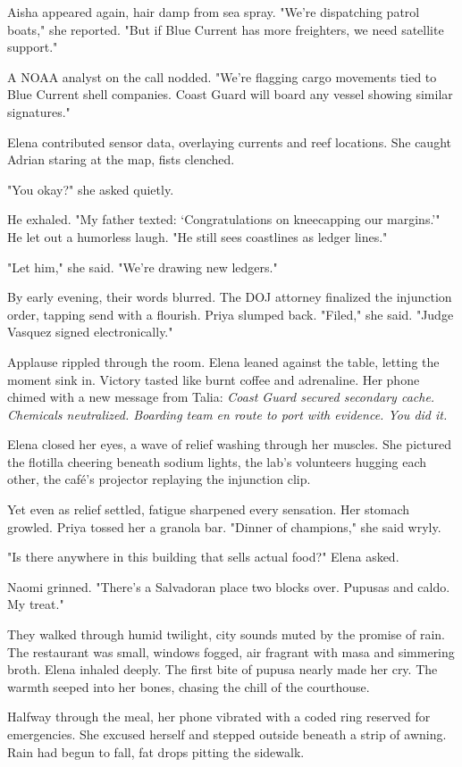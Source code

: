 Aisha appeared again, hair damp from sea spray. "We're dispatching patrol boats," she reported. "But if Blue Current has more freighters, we need satellite support."

A NOAA analyst on the call nodded. "We're flagging cargo movements tied to Blue Current shell companies. Coast Guard will board any vessel showing similar signatures."

Elena contributed sensor data, overlaying currents and reef locations. She caught Adrian staring at the map, fists clenched.

"You okay?" she asked quietly.

He exhaled. "My father texted: `Congratulations on kneecapping our margins.'" He let out a humorless laugh. "He still sees coastlines as ledger lines."

"Let him," she said. "We're drawing new ledgers."

By early evening, their words blurred. The DOJ attorney finalized the injunction order, tapping send with a flourish. Priya slumped back. "Filed," she said. "Judge Vasquez signed electronically."

Applause rippled through the room. Elena leaned against the table, letting the moment sink in. Victory tasted like burnt coffee and adrenaline. Her phone chimed with a new message from Talia: \textit{Coast Guard secured secondary cache. Chemicals neutralized. Boarding team en route to port with evidence. You did it.}

Elena closed her eyes, a wave of relief washing through her muscles. She pictured the flotilla cheering beneath sodium lights, the lab's volunteers hugging each other, the café's projector replaying the injunction clip.

Yet even as relief settled, fatigue sharpened every sensation. Her stomach growled. Priya tossed her a granola bar. "Dinner of champions," she said wryly.

"Is there anywhere in this building that sells actual food?" Elena asked.

Naomi grinned. "There's a Salvadoran place two blocks over. Pupusas and caldo. My treat."

They walked through humid twilight, city sounds muted by the promise of rain. The restaurant was small, windows fogged, air fragrant with masa and simmering broth. Elena inhaled deeply. The first bite of pupusa nearly made her cry. The warmth seeped into her bones, chasing the chill of the courthouse.

Halfway through the meal, her phone vibrated with a coded ring reserved for emergencies. She excused herself and stepped outside beneath a strip of awning. Rain had begun to fall, fat drops pitting the sidewalk.

